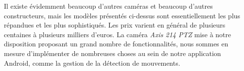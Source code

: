 Il existe évidemment beaucoup d'autres caméras et beaucoup d'autres
constructeurs, mais les modèles présentés ci-dessus sont essentiellement les
plus répandues et les plus sophistiqués. Les prix varient en général de
plusieurs centaines à plusieurs milliers d'euros.
La caméra \textit{Axis 214 PTZ} mise à notre disposition proposant un grand
nombre de fonctionnalités, nous sommes en mesure d'implémenter de nombreuses choses au
sein de notre application Android, comme la gestion de la détection de
mouvements.



